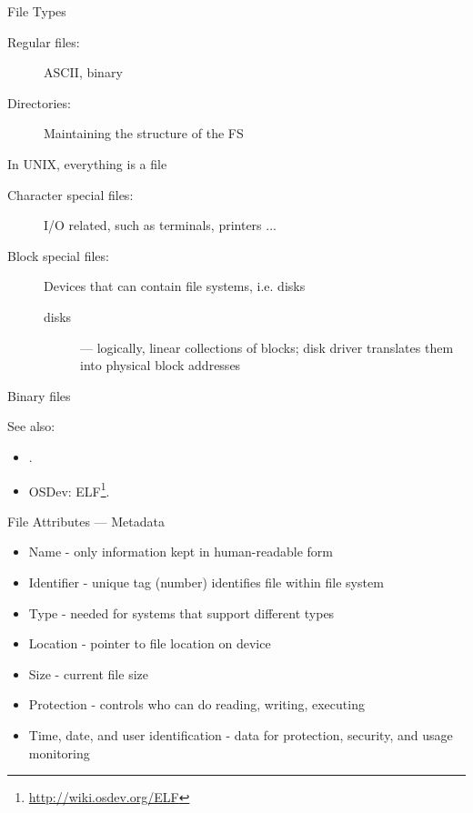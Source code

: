 \begin{frame}{File Types}
  \begin{description}
  \item[Regular files:] ASCII, binary
  \item[Directories:] Maintaining the structure of the FS
  \end{description}
  \begin{block}{In UNIX, everything is a file}
    \begin{description}
    \item[Character special files:] I/O related, such as terminals, printers ...
    \item[Block special files:] Devices that can contain file systems, i.e. disks
      \begin{description}
      \item[disks] --- logically, linear collections of blocks; disk driver translates
        them into physical block addresses
      \end{description}
    \end{description}
  \end{block}
\end{frame}

\begin{frame}
  \begin{iblock}{Binary files}
    \centering
    \mode<beamer>{ \texttt{[image: mos-figs-6-3]} }%
  \end{iblock}
\end{frame}

See also:
\begin{itemize}
\item {}.
\item OSDev: ELF\footnote{\url{http://wiki.osdev.org/ELF}}.
\end{itemize}

\begin{frame}{File Attributes --- Metadata}
  \begin{itemize}
  \item \alert{Name} - only information kept in human-readable form
  \item \alert{Identifier} - unique tag (number) identifies file within file system
  \item \alert{Type} - needed for systems that support different types
  \item \alert{Location} - pointer to file location on device
  \item \alert{Size} - current file size
  \item \alert{Protection} - controls who can do reading, writing, executing
  \item \alert{Time, date, and user identification} - data for protection, security, and
    usage monitoring
  \end{itemize}
\end{frame}

